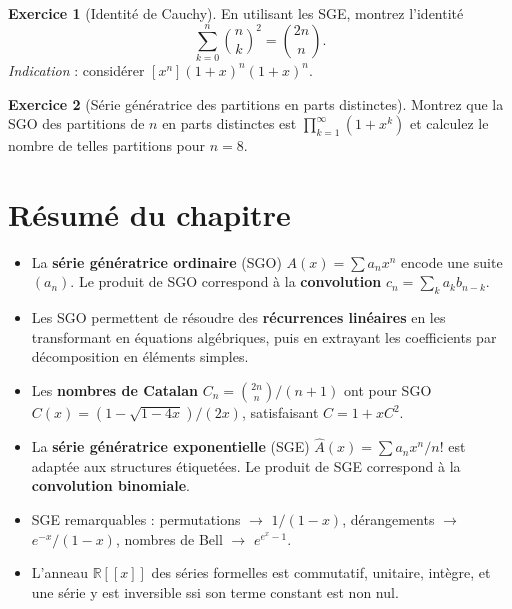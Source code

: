 \documentclass[12pt,a4paper,openany]{book}
\theoremstyle{definition}
\newtheorem{exercice}{Exercice}[chapter]
\theoremstyle{plain}
\theoremstyle{remark}
\newcommand{\R}{\mathbb{R}}
\begin{document}
\begin{exercice}[Identité de Cauchy]
\label{exo:cauchy}
En utilisant les SGE, montrez l'identité
\[
  \sum_{k=0}^{n} \binom{n}{k}^2 = \binom{2n}{n}.
\]
\emph{Indication} : considérer $[x^n](1+x)^n (1+x)^n$.
\end{exercice}

\begin{exercice}[Série génératrice des partitions en parts distinctes]
\label{exo:parts-distinctes}
Montrez que la SGO des partitions de $n$ en parts distinctes est
$\prod_{k=1}^{\infty}(1 + x^k)$ et calculez le nombre de telles partitions
pour $n = 8$.
\end{exercice}

\section*{Résumé du chapitre}

\begin{itemize}[nosep]
  \item La \textbf{série génératrice ordinaire} (SGO) $A(x) = \sum a_n x^n$
    encode une suite $(a_n)$. Le produit de SGO correspond à la
    \textbf{convolution} $c_n = \sum_k a_k b_{n-k}$.
  \item Les SGO permettent de résoudre des \textbf{récurrences linéaires} en
    les transformant en équations algébriques, puis en extrayant les coefficients
    par décomposition en éléments simples.
  \item Les \textbf{nombres de Catalan} $C_n = \binom{2n}{n}/(n+1)$ ont pour SGO
    $C(x) = (1-\sqrt{1-4x})/(2x)$, satisfaisant $C = 1 + xC^2$.
  \item La \textbf{série génératrice exponentielle} (SGE)
    $\hat{A}(x) = \sum a_n x^n/n!$ est adaptée aux structures étiquetées.
    Le produit de SGE correspond à la \textbf{convolution binomiale}.
  \item SGE remarquables : permutations $\to$ $1/(1-x)$, dérangements $\to$
    $e^{-x}/(1-x)$, nombres de Bell $\to$ $e^{e^x-1}$.
  \item L'anneau $\R[[x]]$ des séries formelles est commutatif, unitaire,
    intègre, et une série y est inversible ssi son terme constant est non nul.
\end{itemize}


\end{document}
